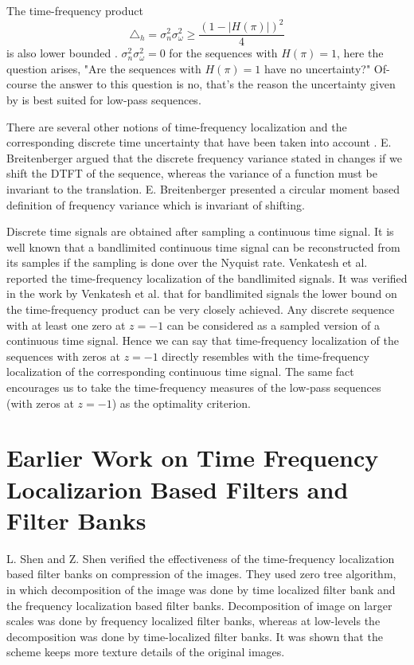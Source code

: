 The time-frequency product 
\begin{equation}
\triangle_{h}=\sigma_{n}^{2}\sigma_{\omega}^{2}\geq\frac{\left(1-\left|H\left(\pi\right)\right|\right)^{2}}{4}\label{eq: tfp_discret}
\end{equation} 
is also lower bounded \cite{key-11}. $\sigma_{n}^{2}\sigma_{\omega}^{2} = 0$ for the sequences with $H(\pi) = 1$, here the question arises, "Are the sequences with $H(\pi)=1$ have no uncertainty?" Of-course the answer to this question is no, that's the reason the uncertainty given by \cite{key-11} is best suited for low-pass sequences. 

There are several other notions of time-frequency localization and the corresponding discrete time uncertainty that have been taken into account \cite{key-11,key-38,key-25,key-33,key-36,key-37,key-34}. E. Breitenberger \cite{key-38} argued that the discrete frequency variance stated in \cite{key-11,key-36} changes if we shift the DTFT of the sequence, whereas the variance of a function must be invariant to the translation. E. Breitenberger \cite{key-38} presented a circular moment based definition of frequency variance which is invariant of shifting.

Discrete time signals are obtained after sampling a continuous time signal. It is well known that a bandlimited continuous time signal can be reconstructed from its samples if the sampling is done over the Nyquist rate. Venkatesh et al. \cite{Venky} reported the time-frequency localization of the bandlimited signals. It was verified in the work by Venkatesh et al. \cite{Venky} that for bandlimited signals the lower bound on the time-frequency product can be very closely achieved. Any discrete sequence with at least one zero at $z = -1$ can be considered as a sampled version of a continuous time signal. Hence we can say that time-frequency localization of the sequences with zeros at $z=-1$ directly resembles with the time-frequency localization of the corresponding continuous time signal. The same fact encourages us to take the time-frequency measures of the low-pass sequences (with zeros at $z=-1$) as the optimality criterion.
\section{Earlier Work on Time Frequency Localizarion Based Filters and Filter Banks}
L. Shen and Z. Shen \cite{shen} verified the effectiveness of the time-frequency localization based filter banks on compression of the images. They used zero tree algorithm, in which decomposition of the image was done by time localized filter bank and the frequency localization based filter banks. Decomposition of image on larger scales was done by frequency localized filter banks, whereas at low-levels the decomposition was done by time-localized filter banks. It was shown that the scheme keeps more texture details of the original images. 

